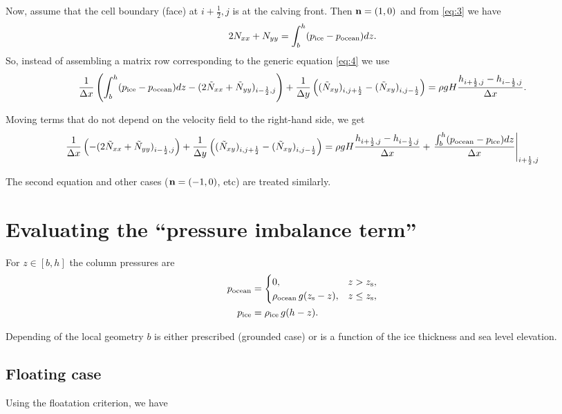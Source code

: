 \documentclass[11pt]{article}
\begin{document}
Now, assume that the cell boundary (face) at $i+\frac12,j$ is at the
calving front. Then $\mathbf{n} = (1,0)$ and from \eqref{eq:3} we have
\begin{equation*}
2N_{xx} + N_{yy} = \int_{b}^{h}(p_{\text{ice}} - p_{\text{ocean}}) dz.
\end{equation*}
So, instead of assembling a matrix row corresponding to the generic
equation \eqref{eq:4} we use
\begin{equation*}
\frac1{\Delta x}\left(\int_{b}^{h}(p_{\text{ice}} - p_{\text{ocean}}) dz - (2\tilde N_{xx} + \tilde N_{yy})_{i-\frac12,j}\right) +
\frac1{\Delta y}\left((\tilde N_{xy})_{i,j+\frac12} - (\tilde N_{xy})_{i,j-\frac12}\right) =
\rho g H \frac{h_{i+\frac12,j} - h_{i-\frac12,j}}{\Delta x}.
\end{equation*}

Moving terms that do not depend on the velocity field to the
right-hand side, we get
\begin{equation*}
\frac1{\Delta x}\left(- (2\tilde N_{xx} + \tilde N_{yy})_{i-\frac12,j}\right) +
\frac1{\Delta y}\left((\tilde N_{xy})_{i,j+\frac12} - (\tilde N_{xy})_{i,j-\frac12}\right) =
\rho g H \frac{h_{i+\frac12,j} - h_{i-\frac12,j}}{\Delta x} + \left.\frac{\int_{b}^{h}(p_{\text{ocean}} - p_{\text{ice}}) dz}{\Delta x}\right|_{i+\frac12,j}
\end{equation*}

The second equation and other cases ($\mathbf{n} = (-1,0)$, etc) are treated
similarly.

\section{Evaluating the ``pressure imbalance term''}
\label{sec-5}

For $z \in [b, h]$ the column pressures are
\begin{align}
p_{\text{ocean}} &= 
\begin{cases}
0, & z > z_{\text{s}},\\
\rho_{\text{ocean}}\, g (z_{\text{s}} - z), & z \le z_{\text{s}},
\end{cases}\\
p_{\text{ice}} &= \rho_{\text{ice}}\, g (h - z).
\end{align}

Depending of the local geometry $b$ is either prescribed (grounded
case) or is a function of the ice thickness and sea level elevation.

\subsection{Floating case}
\label{sec-5-1}

Using the floatation criterion, we have
\end{document}
